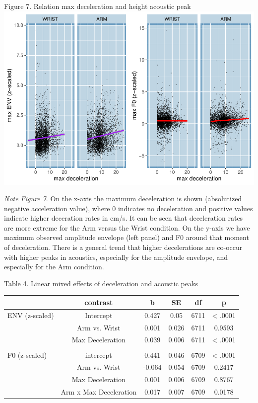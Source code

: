 \documentclass[
  man, noextraspace,floatsintext]{apa6}
\begin{document}
Figure 7. Relation max deceleration and height acoustic peak
\includegraphics{GS_physics_in_fluid_speech_files/figure-latex/impact analysis-1.pdf}

\emph{Note Figure 7}. On the x-axis the maximum deceleration is shown (absolutized negative acceleration value), where 0 indicates no deceleration and positive values indicate higher deceration rates in cm/s. It can be seen that deceleration rates are more extreme for the Arm versus the Wrist condition. On the y-axis we have maximum observed amplitude envelope (left panel) and F0 around that moment of deceleration. There is a general trend that higher decelerations are co-occur with higher peaks in acoustics, especially for the amplitude envelope, and especially for the Arm condition.\\
\newpage

Table 4. Linear mixed effects of deceleration and acoustic peaks

\begin{tabular}{lccccc}
\toprule
  & contrast & b & SE & df & p\\
\midrule
ENV (z-scaled) & Intercept & 0.427 & 0.05 & 6711 & < .0001\\
 & Arm vs. Wrist & 0.001 & 0.026 & 6711 & 0.9593\\
 & Max Deceleration & 0.039 & 0.006 & 6711 & < .0001\\
 &  &  &  &  & \\
F0 (z-scaled) & intercept & 0.441 & 0.046 & 6709 & < .0001\\
\addlinespace
 & Arm vs. Wrist & -0.064 & 0.054 & 6709 & 0.2417\\
 & Max Deceleration & 0.001 & 0.006 & 6709 & 0.8767\\
 & Arm x Max Deceleration & 0.017 & 0.007 & 6709 & 0.0178\\
\bottomrule
\end{tabular}
\end{document}
